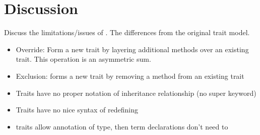 
\section{Discussion}
\label{sec:discuss}

Discuss the limitations/issues of \name. The differences from the original trait model.

\begin{itemize}
\item Override: Form a new trait by layering additional methods over an existing
  trait. This operation is an asymmetric sum.
\item Exclusion: forms a new trait by removing a method from an existing trait
\end{itemize}


\begin{itemize}
\item Traits have no proper notation of inheritance relationship (no super keyword)
\item Traits have no nice syntax of redefining
\item traits allow annotation of type, then term declarations don't need to
\end{itemize}